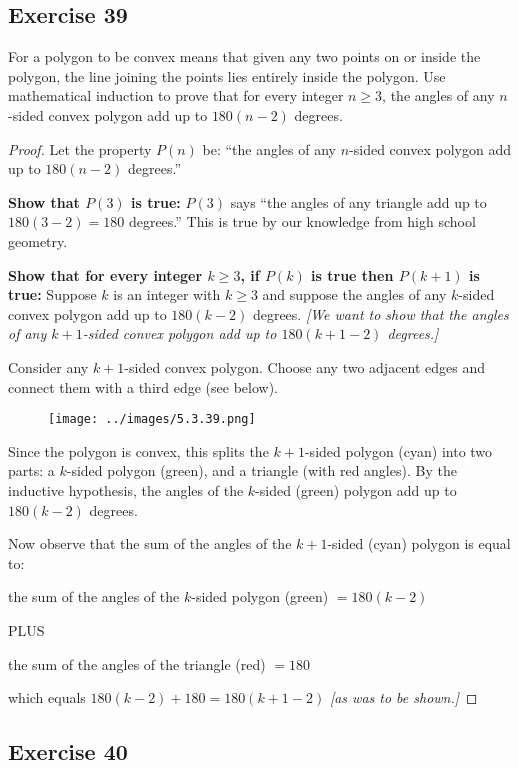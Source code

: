 \documentclass[14pt]{extarticle}
\begin{document}
\subsection{Exercise 39}
For a polygon to be convex means that given any two points on or inside the polygon, the line joining the points lies entirely inside the polygon. Use mathematical induction to prove that for every integer $n \geq 3$, the angles of any $n$-sided convex polygon add up to $180(n - 2)$ degrees.

\begin{proof}
    Let the property $P(n)$ be: ``the angles of any $n$-sided convex polygon add up to $180(n - 2)$ degrees.''

    {\bf Show that $P(3)$ is true:} $P(3)$ says ``the angles of any triangle add up to $180(3 - 2) = 180$ degrees.'' This is true by our knowledge from high school geometry.

        {\bf Show that for every integer $k \geq 3$, if $P(k)$ is true then $P(k+1)$ is true:} Suppose $k$ is an integer with $k \geq 3$ and suppose the angles of any $k$-sided convex polygon add up to $180(k - 2)$ degrees. {\it [We want to show that the angles of any $k+1$-sided convex polygon add up to $180(k+1 - 2)$ degrees.]}

    Consider any $k+1$-sided convex polygon. Choose any two adjacent edges and connect them with a third edge (see below).

    \begin{figure}[ht!]
        \centering
        \texttt{[image: ../images/5.3.39.png]}
    \end{figure}

    Since the polygon is convex, this splits the $k+1$-sided polygon (cyan) into two parts: a $k$-sided polygon (green), and a triangle (with red angles). By the inductive hypothesis, the angles of the $k$-sided (green) polygon add up to $180(k - 2)$ degrees.

    Now observe that the sum of the angles of the $k+1$-sided (cyan) polygon is equal to:

    the sum of the angles of the $k$-sided polygon (green) $ = 180(k-2)$

    PLUS

    the sum of the angles of the triangle (red) $ = 180$

    which equals $180(k-2) + 180 = 180(k+1-2)$ {\it [as was to be shown.]}
\end{proof}

\subsection{Exercise 40}
\end{document}

